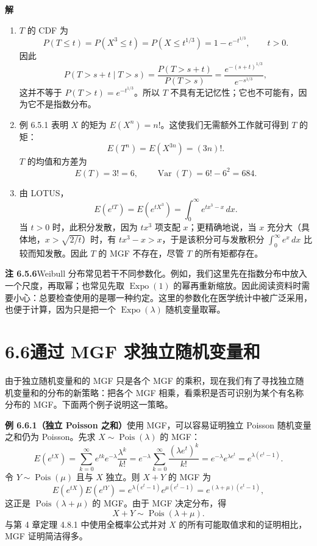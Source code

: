 \documentclass[UTF8, 12pt, fontset=fandol, oneside]{ctexart}
\begin{document}
\noindent\textbf{解}\quad
\begin{enumerate}
  \item $T$ 的 CDF 为
  \[
    P(T\le t)=P(X^3\le t)=P(X\le t^{1/3})=1-e^{-t^{1/3}},\qquad t>0.
  \]
  因此
  \[
    P(T>s+t\mid T>s)
    =
    \frac{P(T>s+t)}{P(T>s)}
    =
    \frac{e^{-(s+t)^{1/3}}}{e^{-s^{1/3}}},
  \]
  这并不等于 $P(T>t)=e^{-t^{1/3}}$。所以 $T$ 不具有无记忆性；它也不可能有，因为它不是指数分布。
  \item 例 6.5.1 表明 $X$ 的矩为 $E(X^n)=n!$。这使我们无需额外工作就可得到 $T$ 的矩：
  \[
    E(T^n)=E(X^{3n})=(3n)!.
  \]
  $T$ 的均值和方差为
  \[
    E(T)=3!=6,\qquad \operatorname{Var}(T)=6!-6^2=684.
  \]
  \item 由 LOTUS，
  \[
    E(e^{tT})=E(e^{tX^3})=\int_0^{\infty}e^{tx^3-x}\,dx.
  \]
  当 $t>0$ 时，此积分发散，因为 $tx^3$ 项支配 $x$；更精确地说，当 $x$ 充分大（具体地，$x>\sqrt{2/t}$）时，有 $tx^3-x>x$，于是该积分可与发散积分 $\int_0^{\infty}e^x\,dx$ 比较而知发散。因此 $T$ 的 MGF 不存在，尽管 $T$ 的所有矩都存在。
\end{enumerate}

\noindent\textbf{注 6.5.6}\quad Weibull 分布常见若干不同参数化。例如，我们这里先在指数分布中放入一个尺度，再取幂；也常见先取 $\operatorname{Expo}(1)$ 的幂再重新缩放。因此阅读资料时需要小心：总要检查使用的是哪一种约定。这里的参数化在医学统计中被广泛采用，也便于计算，因为只是把一个 $\operatorname{Expo}(\lambda)$ 随机变量取幂。

\section*{6.6\quad 通过 MGF 求独立随机变量和}

由于独立随机变量和的 MGF 只是各个 MGF 的乘积，现在我们有了寻找独立随机变量和的分布的新策略：把各个 MGF 相乘，看乘积是否可识别为某个有名称分布的 MGF。下面两个例子说明这一策略。

\noindent\textbf{例 6.6.1（独立 Poisson 之和）}\quad 使用 MGF，可以容易证明独立 Poisson 随机变量之和仍为 Poisson。先求 $X\sim\operatorname{Pois}(\lambda)$ 的 MGF：
\[
  E(e^{tX})
  =
  \sum_{k=0}^{\infty}e^{tk}e^{-\lambda}\frac{\lambda^k}{k!}
  =
  e^{-\lambda}\sum_{k=0}^{\infty}\frac{(\lambda e^t)^k}{k!}
  =
  e^{-\lambda}e^{\lambda e^t}
  =
  e^{\lambda(e^t-1)}.
\]
令 $Y\sim\operatorname{Pois}(\mu)$ 且与 $X$ 独立。则 $X+Y$ 的 MGF 为
\[
  E(e^{tX})E(e^{tY})
  =
  e^{\lambda(e^t-1)}e^{\mu(e^t-1)}
  =
  e^{(\lambda+\mu)(e^t-1)},
\]
这正是 $\operatorname{Pois}(\lambda+\mu)$ 的 MGF。由于 MGF 决定分布，得
\[
  X+Y\sim\operatorname{Pois}(\lambda+\mu).
\]
与第 4 章定理 4.8.1 中使用全概率公式并对 $X$ 的所有可能取值求和的证明相比，MGF 证明简洁得多。
\end{document}
